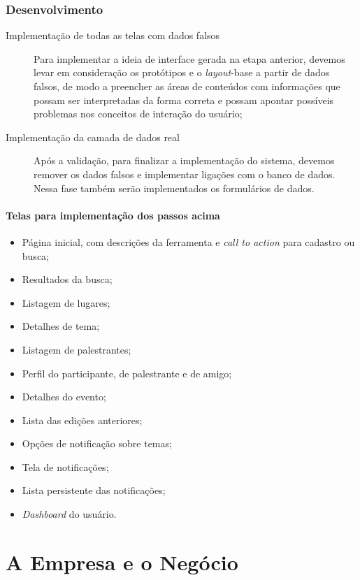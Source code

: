 \documentclass[12pt,a4paper,twoside,hyphens,english,brazil]{abntex2}
\begin{document}
\subsection{Desenvolvimento}
	\begin{description}
		\item[Implementação de todas as telas com dados falsos]
			Para implementar a ideia de interface gerada na etapa anterior, devemos levar em consideração os protótipos e o \emph{layout}-base a partir de dados falsos, de modo a preencher as áreas de conteúdos com informações que possam ser interpretadas da forma correta e possam apontar possíveis problemas nos conceitos de interação do usuário;
		\item[Implementação da camada de dados real]
			Após a validação, para finalizar a implementação do sistema, devemos remover os dados falsos e implementar ligações com o banco de dados. Nessa fase também serão implementados os formulários de dados.
	\end{description}
	
	\subsubsection*{Telas para implementação dos passos acima}
		\begin{itemize}[itemsep=-1ex]
			\item Página inicial, com descrições da ferramenta e \emph{call to action} para cadastro ou busca;
			\item Resultados da busca;
			\item Listagem de lugares;
			\item Detalhes de tema;
			\item Listagem de palestrantes;
			\item Perfil do participante, de palestrante e de amigo;
			\item Detalhes do evento;
			\item Lista das edições anteriores;
			\item Opções de notificação sobre temas;
			\item Tela de notificações;
			\item Lista persistente das notificações;
			\item \emph{Dashboard} do usuário.
		\end{itemize}

\chapter{A Empresa e o Negócio}
\end{document}
